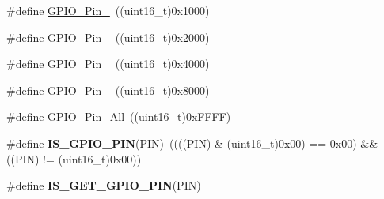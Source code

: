 \begin{DoxyCompactItemize}
\item 
\#define \hyperlink{group__GPIO__pins__define_gada91257dcaab2c86f75fbd8e4b52b98c}{GPIO\_\-Pin\_}~((uint16\_\-t)0x1000)
\item 
\#define \hyperlink{group__GPIO__pins__define_ga4155a41c433f3657b9c79cfbd4240966}{GPIO\_\-Pin\_}~((uint16\_\-t)0x2000)
\item 
\#define \hyperlink{group__GPIO__pins__define_ga21cd1d89c0c061a6f09c5a842610bee5}{GPIO\_\-Pin\_}~((uint16\_\-t)0x4000)
\item 
\#define \hyperlink{group__GPIO__pins__define_gae686a9fc47cf3e420e5db0784210711d}{GPIO\_\-Pin\_}~((uint16\_\-t)0x8000)
\item 
\#define \hyperlink{group__GPIO__pins__define_gaba3e915ddca17a1211edc07b7fd97e8b}{GPIO\_\-Pin\_\-All}~((uint16\_\-t)0xFFFF)
\item 
\hypertarget{group__GPIO__pins__define_gad6ec74e33360395535ad5d91ba6d4781}{
\#define {\bfseries IS\_\-GPIO\_\-PIN}(PIN)~((((PIN) \& (uint16\_\-t)0x00) == 0x00) \&\& ((PIN) != (uint16\_\-t)0x00))}
\label{group__GPIO__pins__define_gad6ec74e33360395535ad5d91ba6d4781}

\item 
\#define {\bfseries IS\_\-GET\_\-GPIO\_\-PIN}(PIN)
\end{DoxyCompactItemize}


